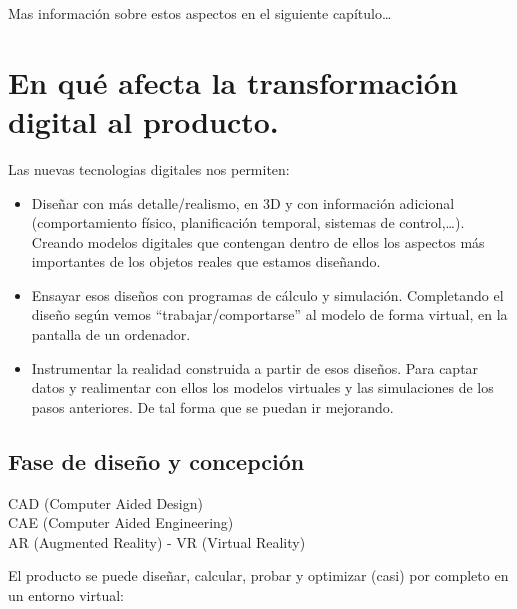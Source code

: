 \documentclass[spanish,12pt,a4paper,final,oneside]{book}
\begin{document}
\vspace{1cm}
Mas información sobre estos aspectos en el siguiente capítulo\ldots


\chapter{En qué afecta la transformación digital al producto.}

Las nuevas tecnologias digitales nos permiten:
\begin{itemize}
\item Diseñar con más detalle/realismo, en 3D y con información adicional (comportamiento físico, planificación temporal, sistemas de control,\ldots). Creando modelos digitales que contengan dentro de ellos los aspectos más importantes de los objetos reales que estamos diseñando.
\item Ensayar esos diseños con programas de cálculo y simulación. Completando el diseño según vemos ``trabajar/comportarse'' al modelo de forma virtual, en la pantalla de un ordenador.
\item Instrumentar la realidad construida a partir de esos diseños. Para captar datos y realimentar con ellos los modelos virtuales y las simulaciones de los pasos anteriores. De tal forma que se puedan ir mejorando.
\end{itemize}


\section{Fase de diseño y concepción}\label{diseño_de_producto}
CAD (Computer Aided Design)
\\CAE (Computer Aided Engineering)
\\AR (Augmented Reality) - VR (Virtual Reality)

El producto se puede diseñar, calcular, probar y optimizar (casi) por completo en un entorno virtual:
\end{document}
